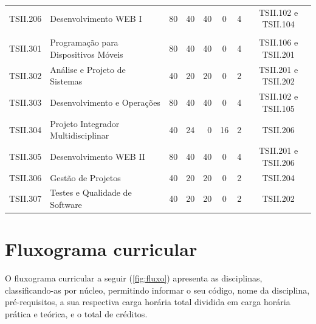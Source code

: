 \documentclass[
	12pt,				%
	openright,			%
	twoside,			%
	a4paper,			%
	chapter=TITLE,		%
	english,			%
	french,				%
	spanish,			%
	brazil,				%
	]{abntex2}
\begin{document}
\begin{landscape}
\begin{quadro}[h]
{\begin{tabularx}{\linewidth}{cXrrrccc}
TSII.206 & Desenvolvimento WEB I                   & 80 & 40 & 40 & 0  & 4 & TSII.102 e TSII.104 \\
                            \\
\rowcolor[HTML]{EFEFEF} 
TSII.301 & Programação para Dispositivos Móveis    & 80 & 40 & 40 & 0  & 4 & TSII.106 e TSII.201 \\
TSII.302 & Análise e Projeto de Sistemas           & 40 & 20 & 20 & 0  & 2 & TSII.201 e TSII.202 \\
\rowcolor[HTML]{EFEFEF} 
TSII.303 & Desenvolvimento e Operações             & 80 & 40 & 40 & 0  & 4 & TSII.102 e TSII.105 \\
TSII.304 & Projeto Integrador Multidisciplinar     & 40 & 24 & 0  & 16 & 2 & TSII.206            \\
\rowcolor[HTML]{EFEFEF} 
TSII.305 & Desenvolvimento WEB II                  & 80 & 40 & 40 & 0  & 4 & TSII.201 e TSII.206 \\
TSII.306 & Gestão de Projetos                      & 40 & 20 & 20 & 0  & 2 & TSII.204            \\
\rowcolor[HTML]{EFEFEF} 
TSII.307 & Testes e Qualidade de Software          & 40 & 20 & 20 & 0  & 2 & TSII.202            \\ \hline
\end{tabularx}

}{
}
\end{quadro}

\clearpage
\newpage



\end{landscape}

\section{Fluxograma curricular}

O fluxograma curricular a seguir (\autoref{fig:fluxo}) apresenta as disciplinas, classificando-as por núcleo, permitindo informar o seu código, nome da disciplina, pré-requisitos, a sua respectiva carga horária total dividida em carga horária prática e teórica, e o total de créditos. %
\end{document}
